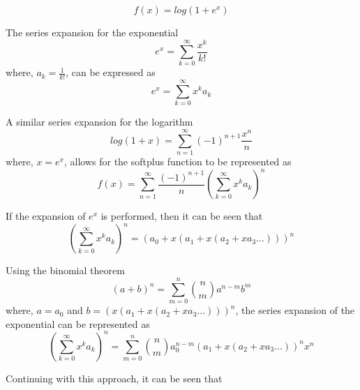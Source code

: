 \begin{equation}
	f(x) = log(1+e^x)
\end{equation} 

The series expansion for the exponential
\begin{equation}
	e^x = \sum_{k=0}^\infty \frac{x^k}{k!}
\end{equation}
where, $a_k = \frac{1}{k!}$, can be expressed as
\begin{equation}
	e^x = \sum_{k=0}^\infty x^k a_k
\end{equation}

A similar series expansion for the logarithm
\begin{equation}
	log(1+x) = \sum_{n=1}^\infty (-1)^{n+1} \frac{x^n}{n}
\end{equation}
where, $x = e^x$,
allows for the softplus function to be represented as
\begin{equation}
	f(x) = \sum_{n=1}^\infty \frac{(-1)^{n+1}}{n} 				(\sum_{k=0}^\infty x^k a_k)^n
\end{equation}

If the expansion of $e^x$ is performed, then it can be seen that
\begin{equation}
	(\sum_{k=0}^\infty x^k a_k)^n = 								(a_0+x(a_1+x(a_2+xa_3...)))^n
\end{equation}

Using the binomial theorem
\begin{equation}
	(a+b)^n = \sum_{m=0}^{n} \binom{n}{m} a^{n-m} b^m
\end{equation}
where, $a=a_0$ and $b=(x(a_1+x(a_2+xa_3...)))^n$, the series expansion of the exponential can be represented as
\begin{equation}
	(\sum_{k=0}^\infty x^k a_k)^n = \sum_{m=0}^{n} 				\binom{n}{m} a_0^{n-m} (a_1+x(a_2+xa_3...))^n x^n
\end{equation}

Continuing with this approach, it can be seen that 
	
